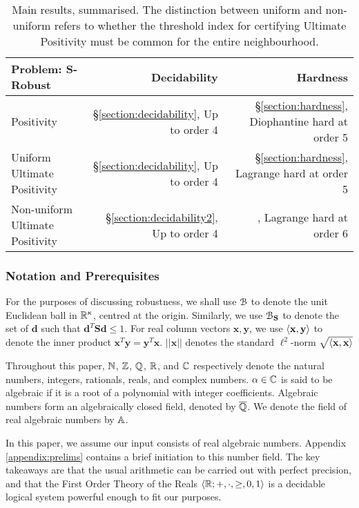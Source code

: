 \begin{table}[H]
\begin{tabular}{|l|r|r|}
  \hline
   \textbf{Problem:} $\mathbf{S}$-\textbf{Robust}& \textbf{Decidability }& {\bf Hardness} \\
  \hline
  Positivity & \S\ref{section:decidability}, Up to order 4 & \S\ref{section:hardness}, Diophantine hard at order 5\\
  Uniform Ultimate Positivity & \S\ref{section:decidability}, Up to order 4 & \S\ref{section:hardness}, Lagrange hard at order 5 \\
  Non-uniform Ultimate Positivity & \S\ref{section:decidability2}, Up to order 4 & \cite{joeljames3,originalarxiv}, Lagrange hard at order 6 
  \\
  \hline
\end{tabular}

\caption{Main results, summarised. The distinction between uniform and non-uniform refers to whether the threshold index for certifying Ultimate Positivity must be common for the entire neighbourhood.}%
  \label{tab:results}
\end{table}

\subsubsection*{Notation and Prerequisites}
For the purposes of discussing robustness, we shall use $\mathcal{B}$ to denote the unit Euclidean ball in $\mathbb{R}^\kappa$, centred at the origin. Similarly, we use $\mathcal{B}_{\mathbf{S}}$ to denote the set of $\mathbf{d}$ such that $\mathbf{d}^T\mathbf{Sd} \le 1$. For real column vectors $\mathbf{x}, \mathbf{y}$, we use $\langle\mathbf{x}, \mathbf{y}\rangle$ to denote the inner product $\mathbf{x}^T\mathbf{y} = \mathbf{y}^T\mathbf{x}$. $||\mathbf{x}||$ denotes the standard $\ell^2$-norm $\sqrt{\langle\mathbf{x}, \mathbf{x}\rangle}$

Throughout this paper,  $\mathbb{N}$, $\mathbb{Z}$, $\mathbb{Q}$, $\mathbb{R}$, and $\mathbb{C}$ respectively denote the natural numbers, integers, rationals, reals, and complex numbers. $\alpha \in \mathbb{C}$ is said to be algebraic if it is a root of a polynomial with integer coefficients. Algebraic numbers form an algebraically closed field, denoted by $\overline{\mathbb{Q}}$. We denote the field of real algebraic numbers by $\mathbb{A}$.

In this paper, we assume our input consists of real algebraic numbers. Appendix \ref{appendix:prelims} contains a brief initiation to this number field. The key takeaways are that the usual arithmetic can be carried out with perfect precision, and that the First Order Theory of the Reals $\langle\mathbb{R}; +, \cdot, \ge, 0, 1\rangle$ is a decidable logical system powerful enough to fit our purposes.

